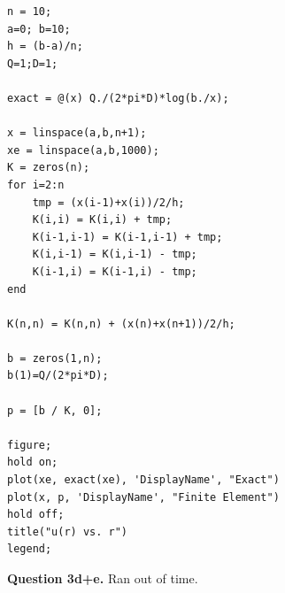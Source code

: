 \documentclass[letterpaper, reqno,11pt]{article}
\begin{document}
\begin{lstlisting}
n = 10;
a=0; b=10;
h = (b-a)/n;
Q=1;D=1;

exact = @(x) Q./(2*pi*D)*log(b./x);

x = linspace(a,b,n+1);
xe = linspace(a,b,1000);
K = zeros(n);
for i=2:n
    tmp = (x(i-1)+x(i))/2/h;
    K(i,i) = K(i,i) + tmp;
    K(i-1,i-1) = K(i-1,i-1) + tmp;
    K(i,i-1) = K(i,i-1) - tmp;
    K(i-1,i) = K(i-1,i) - tmp;
end

K(n,n) = K(n,n) + (x(n)+x(n+1))/2/h;

b = zeros(1,n);
b(1)=Q/(2*pi*D);

p = [b / K, 0];

figure;
hold on;
plot(xe, exact(xe), 'DisplayName', "Exact")
plot(x, p, 'DisplayName', "Finite Element")
hold off;
title("u(r) vs. r")
legend;

\end{lstlisting}

{\medskip\noindent\bf Question 3d+e.} Ran out of time.
\end{document}
